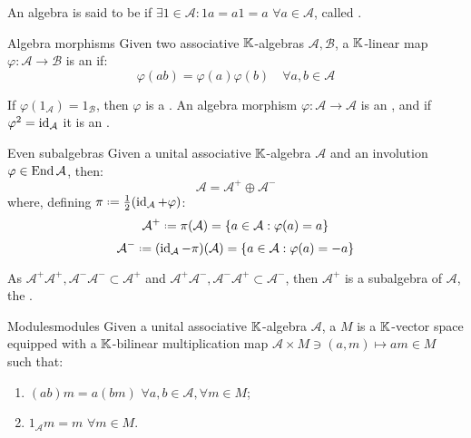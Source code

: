 An algebra is said to be  if $ \exists \mathit{1} \in \mathcal{A} : \mathit{1}a = a\mathit{1} = a \,\,\forall a \in \mathcal{A} $, called .

\begin{definition}{Algebra morphisms}{}
  Given two associative $ \mathbb{K} $-algebras $ \mathcal{A} , \mathcal{B} $, a $ \mathbb{K} $-linear map $ \varphi : \mathcal{A} \rightarrow \mathcal{B} $ is an  if:
  \begin{equation*}
    \varphi(ab) = \varphi(a) \varphi(b) \quad\forall a,b \in \mathcal{A}
  \end{equation*}
\end{definition}

If $ \varphi(\mathit{1}_\mathcal{A}) = \mathit{1}_\mathcal{B} $, then $ \varphi $ is a . An algebra morphism $ \varphi : \mathcal{A} \rightarrow \mathcal{A} $ is an , and if $ \varphi^2 = \operatorname{id}_\mathcal{A} $ it is an .

\begin{proposition}{Even subalgebras}{}
  Given a unital associative $ \mathbb{K} $-algebra $ \mathcal{A} $ and an involution $ \varphi \in \operatorname{End} \mathcal{A} $, then:
  \begin{equation*}
    \mathcal{A} = \mathcal{A}^+ \oplus \mathcal{A}^-
  \end{equation*}
  where, defining $ \pi \defeq \frac{1}{2} (\id_\mathcal{A} + \varphi) $:
  \begin{equation*}
    \mathcal{A}^+ \defeq \pi(\mathcal{A}) = \{a \in \mathcal{A} : \varphi(a) = a\}
  \end{equation*}
  \begin{equation*}
    \mathcal{A}^- \defeq (\id_\mathcal{A} - \pi)(\mathcal{A}) = \{a \in \mathcal{A} : \varphi(a) = -a\}
  \end{equation*}
\end{proposition}

As $ \mathcal{A}^+ \mathcal{A}^+ , \mathcal{A}^- \mathcal{A}^- \subset \mathcal{A}^+ $ and $ \mathcal{A}^+ \mathcal{A}^- , \mathcal{A}^- \mathcal{A}^+ \subset \mathcal{A}^- $, then $ \mathcal{A}^+ $ is a subalgebra of $ \mathcal{A} $, the .

\begin{definition}{Modules}{modules}
  Given a unital associative $ \mathbb{K} $-algebra $ \mathcal{A} $, a  $ M $ is a $ \mathbb{K} $-vector space equipped with a $ \mathbb{K} $-bilinear multiplication map $ \mathcal{A} \times M \ni (a,m) \mapsto am \in M $ such that:
  \begin{enumerate}
    \item $ (ab)m = a(bm) \,\,\forall a,b \in \mathcal{A} , \forall m \in M $;
    \item $ \mathit{1}_\mathcal{A} m = m \,\,\forall m \in M $.
  \end{enumerate}
\end{definition}

